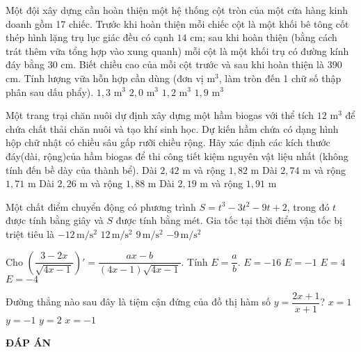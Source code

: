 \begin{ex}%
	Một đội xây dựng cần hoàn thiện một hệ thống cột tròn của một cửa hàng kinh doanh gồm 17 chiếc. Trước khi hoàn thiện mỗi chiếc cột là một khối bê tông cốt thép hình lặng trụ lục giác đều có cạnh $14$ cm; sau khi hoàn thiện (bằng cách trát thêm vữa tổng hợp vào xung quanh) mỗi cột là một khối trụ có đường kính đáy bằng $30$ cm. Biết chiều cao của mỗi cột trước và sau khi hoàn thiện là $390$ cm. Tính lượng vữa hỗn hợp cần dùng (đơn vị $\mathrm{m}^3$, làm tròn đến 1 chữ số thập phân sau dấu phẩy).
	\choice
	{\True $1,3$ $\mathrm{ m}^3$}
	{$2,0$ $\mathrm{ m}^3$}
	{$1,2$ $\mathrm{ m}^3 $}
	{$1,9$ $\mathrm{ m}^3$}
\end{ex}
\begin{ex}%
	Một trang trại chăn nuôi dự định xây dựng một hầm biogas với thể tích $12$ $\mathrm{m}^3$ để chứa chất thải chăn nuôi và tạo khí sinh học. Dự kiến hầm chứa có dạng hình hộp chữ nhật có chiều sâu gấp rưỡi chiều rộng. Hãy xác định các kích thước đáy(dài, rộng)của hầm biogas để thi công tiết kiệm nguyên vật liệu nhất (không tính đến bề dày của thành bể).
	\choice
	{Dài $2,42$ m và rộng $1,82$ m}
	{Dài $2,74$ m và rộng $1,71$ m}
	{\True Dài $2,26$ m và rộng $1,88$ m}
	{Dài $2,19$ m và rộng $1,91$ m}
\end{ex}
\begin{ex}%
	Một chất điểm chuyển động có phương trình $S =t^3-3t^2-9t+2$, trong đó $t$ được tính bằng giây và $S$ được tính bằng mét. Gia tốc tại thời điểm vận tốc bị triệt tiêu là
	\choice
	{$-12\, \mathrm{m}/\mathrm{s}^2$}
	{\True $ 12\, \mathrm{m}/\mathrm{s}^2$}
	{$ 9\, \mathrm{m}/\mathrm{s}^2$}
	{$ - 9\, \mathrm{m}/\mathrm{s}^2$}
\end{ex}
\begin{ex}%
	Cho $\left(\dfrac{3-2x}{\sqrt{4x-1}}\right)'=\dfrac{ax-b}{(4x-1)\sqrt{4x-1}}$. Tính $E=\dfrac{a}{b}$.
	\choice
	{$E=-16$}
	{\True $E=-1$}
	{$E=4$}
	{$E=-4$}
\end{ex}
\begin{ex}%
	Đường thẳng nào sau đây là tiệm cận đứng của đồ thị hàm số $y=\dfrac{2x+1}{x+1}$?
	\choice
	{$x= 1$}
	{$y=-1$}
	{$y=2$}
	{\True $x=-1$}
\end{ex}
	
	\newpage
	\begin{center}
		\textbf{ĐÁP ÁN}
	\end{center}
	\begin{multicols}{10}
		 
	\end{multicols}
